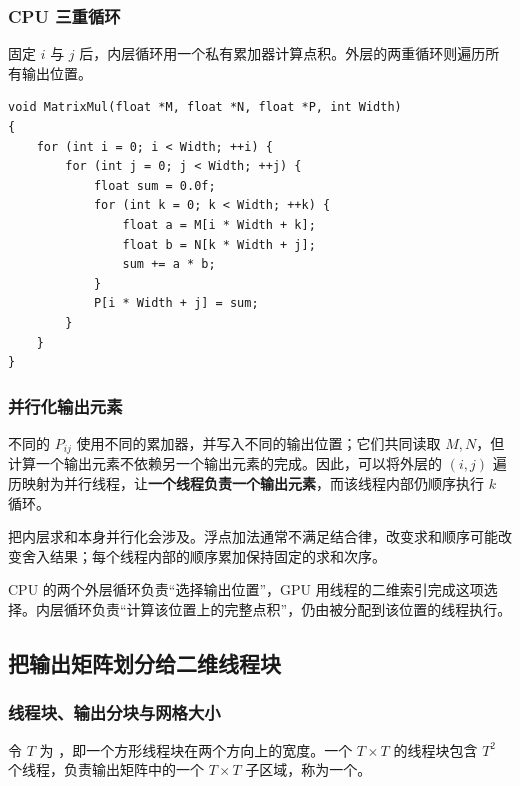 \subsubsection{CPU 三重循环}
\par\noindent\begin{minipage}{\linewidth}
固定 $i$ 与 $j$ 后，内层循环用一个私有累加器计算点积。外层的两重循环则遍历所有输出位置。

\begin{lstlisting}[caption={基本 CPU 矩阵乘法，保留行主序寻址和三重循环结构。}]
void MatrixMul(float *M, float *N, float *P, int Width)
{
    for (int i = 0; i < Width; ++i) {
        for (int j = 0; j < Width; ++j) {
            float sum = 0.0f;
            for (int k = 0; k < Width; ++k) {
                float a = M[i * Width + k];
                float b = N[k * Width + j];
                sum += a * b;
            }
            P[i * Width + j] = sum;
        }
    }
}
\end{lstlisting}
\end{minipage}\par

\subsubsection{并行化输出元素}
不同的 $P_{ij}$ 使用不同的累加器，并写入不同的输出位置；它们共同读取 $M,N$，但计算一个输出元素不依赖另一个输出元素的完成。因此，可以将外层的 $(i,j)$ 遍历映射为并行线程，让\textbf{一个线程负责一个输出元素}，而该线程内部仍顺序执行 $k$ 循环。

把内层求和本身并行化会涉及。浮点加法通常不满足结合律，改变求和顺序可能改变舍入结果；每个线程内部的顺序累加保持固定的求和次序。

\begin{keybox}[title={CPU 循环与 GPU 线程的对应关系}]
CPU 的两个外层循环负责“选择输出位置”，GPU 用线程的二维索引完成这项选择。内层循环负责“计算该位置上的完整点积”，仍由被分配到该位置的线程执行。
\end{keybox}

\subsection{把输出矩阵划分给二维线程块}

\subsubsection{线程块、输出分块与网格大小}
令 $T$ 为 ，即一个方形线程块在两个方向上的宽度。一个 $T\times T$ 的线程块包含 $T^2$ 个线程，负责输出矩阵中的一个 $T\times T$ 子区域，称为一个。

